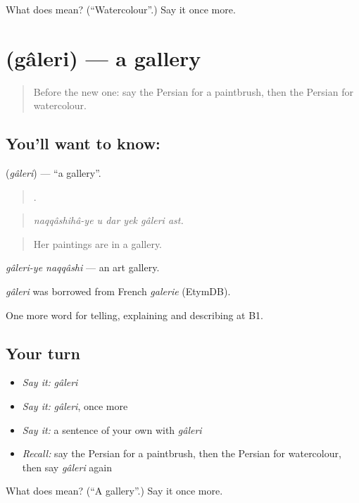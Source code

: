 \begin{tcolorbox}[breakable,colback=teal!4,colframe=teal!35!black,title={Before you move on}]
What does  mean? (\textquotedblleft{}Watercolour\textquotedblright{}.) Say it once more.
\end{tcolorbox}
\section[\texorpdfstring{\fa{گالری} (gâleri)}{گالری (gâleri)}]{ (gâleri) — a gallery}

\label{lesson:FA-C525-galeri}



\begin{quote}
Before the new one: say the Persian for a paintbrush, then the Persian for watercolour.
\end{quote}

\subsection*{You'll want to know: }
\textbf{} (\emph{gâleri}) — \textquotedblleft{}a gallery\textquotedblright{}.

\begin{quote}
      .
\end{quote}

\begin{quote}
\emph{naqqâshihâ-ye u dar yek gâleri ast.}
\end{quote}

\begin{quote}
Her paintings are in a gallery.
\end{quote}

\emph{gâleri-ye naqqâshi} — an art gallery.

\begin{cousinweb}
\emph{gâleri} was borrowed from French \emph{galerie} (EtymDB).
\end{cousinweb}

\begin{grammarlens}[title={What you've built}]
One more word for telling, explaining and describing at B1.
\end{grammarlens}

\subsection*{Your turn}
\begin{itemize}
\raggedright
  \item \emph{Say it:} \emph{gâleri}
  \item \emph{Say it:} \emph{gâleri}, once more
  \item \emph{Say it:} a sentence of your own with \emph{gâleri}
  \item \emph{Recall:} say the Persian for a paintbrush, then the Persian for watercolour, then say \emph{gâleri} again
\end{itemize}

\begin{tcolorbox}[breakable,colback=teal!4,colframe=teal!35!black,title={Before you move on}]
What does  mean? (\textquotedblleft{}A gallery\textquotedblright{}.) Say it once more.
\end{tcolorbox}
